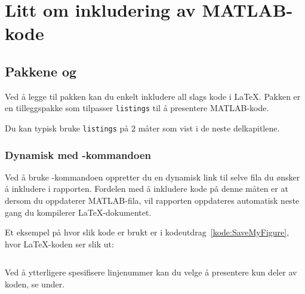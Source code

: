 

\chapter{Litt om inkludering av MATLAB-kode}\label{kap:kode}


\section{Pakkene  og }\label{delkap:lstinput}
Ved å legge til pakken  
kan du enkelt inkludere all slags kode i {\LaTeX}. Pakken 
er en tilleggspakke som tilpasser {\tt listings} til å presentere MATLAB-kode.

Du kan typisk bruke {\tt listings} på 2 måter som vist i de neste delkapitlene.

\subsection{Dynamisk med -kommandoen}
Ved å  
bruke -kommandoen oppretter du 
en dynamisk link til selve fila du ønsker å inkludere i rapporten.
Fordelen med å inkludere kode på denne måten 
er at dersom du oppdaterer MATLAB-fila, vil
rapporten oppdateres automatisk neste gang du kompilerer {\LaTeX}-dokumentet.

\newpage
Et eksempel på hvor slik kode er brukt er i
kodeutdrag~\ref{kode:SaveMyFigure}, hvor {\LaTeX}-koden 
ser slik ut:

\label{side:kodelisting}
\begin{boxedminipage}{\textwidth}
\begin{verbatim}

\end{verbatim}
\end{boxedminipage}

Ved å ytterligere spesifisere linjenummer kan du velge å presentere kun deler
av koden, se under.
  
\begin{boxedminipage}{\textwidth}
\begin{verbatim}

\end{verbatim}
\end{boxedminipage}

